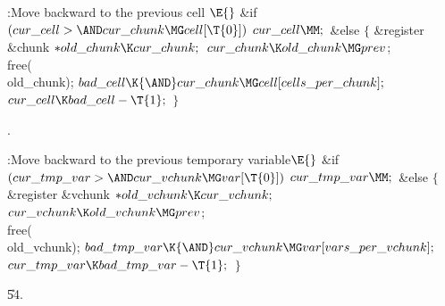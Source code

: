 \B{}:Move  backward to the previous cell%
\X${}\E{}$\6
\&{if} ${}(\\{cur\_cell}>{\AND}\\{cur\_chunk}\MG\\{cell}[\T{0}]){}$\1\5
${}\\{cur\_cell}\MM;{}$\2\6
\&{else}\5
${}\{{}$\1\6
\&{register} \&{chunk} ${}{*}\\{old\_chunk}\K\\{cur\_chunk};{}$\7
${}\\{cur\_chunk}\K\\{old\_chunk}\MG\\{prev}{}$;\5
\\{free}(\\{old\_chunk});\6
${}\\{bad\_cell}\K{\AND}\\{cur\_chunk}\MG\\{cell}[\\{cells\_per\_chunk}];{}$\6
${}\\{cur\_cell}\K\\{bad\_cell}-\T{1};{}$\6
\4${}\}{}$\2\par
{}.\fi

\B{}:Move  backward to the previous
temporary variable\X${}\E{}$\6
\&{if} ${}(\\{cur\_tmp\_var}>{\AND}\\{cur\_vchunk}\MG\\{var}[\T{0}]){}$\1\5
${}\\{cur\_tmp\_var}\MM;{}$\2\6
\&{else}\5
${}\{{}$\1\6
\&{register} \&{vchunk} ${}{*}\\{old\_vchunk}\K\\{cur\_vchunk};{}$\7
${}\\{cur\_vchunk}\K\\{old\_vchunk}\MG\\{prev}{}$;\5
\\{free}(\\{old\_vchunk});\6
${}\\{bad\_tmp\_var}\K{\AND}\\{cur\_vchunk}\MG\\{var}[\\{vars\_per%
\_vchunk}];{}$\6
${}\\{cur\_tmp\_var}\K\\{bad\_tmp\_var}-\T{1};{}$\6
\4${}\}{}$\2\par
\U54.\fi

